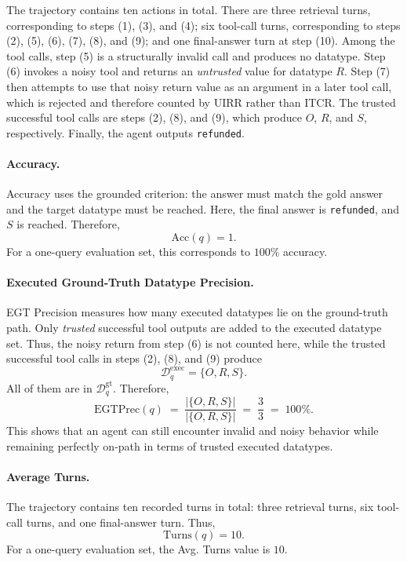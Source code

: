 \documentclass{llmxive}
\begin{document}
The trajectory contains ten actions in total. 
There are three retrieval turns, corresponding to steps (1), (3), and (4); six tool-call turns, corresponding to steps (2), (5), (6), (7), (8), and (9); and one final-answer turn at step (10).
Among the tool calls, step (5) is a structurally invalid call and produces no datatype.
Step (6) invokes a noisy tool and returns an \emph{untrusted} value for datatype $R$.
Step (7) then attempts to use that noisy return value as an argument in a later tool call, which is rejected and therefore counted by UIRR rather than ITCR.
The trusted successful tool calls are steps (2), (8), and (9), which produce $O$, $R$, and $S$, respectively.
Finally, the agent outputs \texttt{refunded}.

\paragraph{Accuracy.}
Accuracy uses the grounded criterion: the answer must match the gold answer and the target datatype must be reached. 
Here, the final answer is \texttt{refunded}, and $S$ is reached. 
Therefore,
\begin{equation}
\mathrm{Acc}(q)=1.
\end{equation}
For a one-query evaluation set, this corresponds to $100\%$ accuracy.

\paragraph{Executed Ground-Truth Datatype Precision.}
EGT Precision measures how many executed datatypes lie on the ground-truth path.
Only \emph{trusted} successful tool outputs are added to the executed datatype set.
Thus, the noisy return from step (6) is not counted here, while the trusted successful tool calls in steps (2), (8), and (9) produce
\begin{equation}
\mathcal{D}^{\mathrm{exec}}_q = \{O,R,S\}.
\end{equation}
All of them are in $\mathcal{D}^{\mathrm{gt}}_q$.
Therefore,
\begin{equation}
\mathrm{EGTPrec}(q)
\;=\; \frac{|\{O,R,S\}|}{|\{O,R,S\}|}
\;=\; \frac{3}{3}
\;=\; 100\%.
\end{equation}
This shows that an agent can still encounter invalid and noisy behavior while remaining perfectly on-path in terms of trusted executed datatypes.

\paragraph{Average Turns.}
The trajectory contains ten recorded turns in total: three retrieval turns, six tool-call turns, and one final-answer turn.
Thus,
\begin{equation}
\mathrm{Turns}(q)=10.
\end{equation}
For a one-query evaluation set, the Avg. Turns value is $10$.
\end{document}

